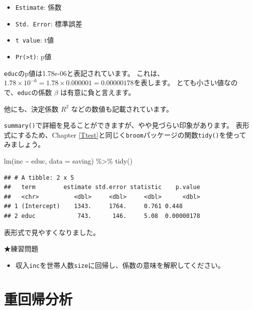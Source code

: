 \documentclass[
]{book}
\newenvironment{Shaded}{\begin{snugshade}}{\end{snugshade}}
\newcommand{\AttributeTok}[1]{\textcolor[rgb]{0.77,0.63,0.00}{#1}}
\newcommand{\FunctionTok}[1]{\textcolor[rgb]{0.00,0.00,0.00}{#1}}
\newcommand{\NormalTok}[1]{#1}
\newcommand{\SpecialCharTok}[1]{\textcolor[rgb]{0.00,0.00,0.00}{#1}}
\providecommand{\tightlist}{%
  \setlength{\itemsep}{0pt}\setlength{\parskip}{0pt}}
\begin{document}
\begin{itemize}
\tightlist
\item
  \texttt{Estimate}: 係数
\item
  \texttt{Std.\ Error}: 標準誤差
\item
  \texttt{t\ value}: t値
\item
  \texttt{Pr(\textgreater{}\textbar{}t\textbar{})}: p値
\end{itemize}

\texttt{educ}のp値は1.78e-06と表記されています。
これは、\(1.78 \times 10^{-6} = 1.78 \times 0.000001 = 0.00000178\)を表します。
とても小さい値なので、\texttt{educ}の係数 \(\beta\) は有意に負と言えます。

他にも、決定係数 \(R^2\) などの数値も記載されています。

\texttt{summary()}で詳細を見ることができますが、やや見づらい印象があります。
表形式にするため、Chapter \ref{Ttest}と同じく\texttt{broom}パッケージの関数\texttt{tidy()}を使ってみましょう。

\begin{Shaded}
\begin{Highlighting}[]
\FunctionTok{lm}\NormalTok{(inc }\SpecialCharTok{\textasciitilde{}}\NormalTok{ educ, }\AttributeTok{data =}\NormalTok{ saving) }\SpecialCharTok{\%\textgreater{}\%}
  \FunctionTok{tidy}\NormalTok{()}
\end{Highlighting}
\end{Shaded}

\begin{verbatim}
## # A tibble: 2 x 5
##   term        estimate std.error statistic    p.value
##   <chr>          <dbl>     <dbl>     <dbl>      <dbl>
## 1 (Intercept)    1343.     1764.     0.761 0.448     
## 2 educ            743.      146.     5.08  0.00000178
\end{verbatim}

表形式で見やすくなりました。

★練習問題

\begin{itemize}
\tightlist
\item
  収入\texttt{inc}を世帯人数\texttt{size}に回帰し、係数の意味を解釈してください。
\end{itemize}

\hypertarget{ux91cdux56deux5e30ux5206ux6790}{%
\section{重回帰分析}\label{ux91cdux56deux5e30ux5206ux6790}}
\end{document}
